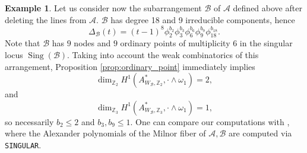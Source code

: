 \documentclass[11pt]{amsart}
\DeclareMathOperator{\Sing}{Sing}
\def\cA{{\mathcal A}}
\def\w{\omega}
\theoremstyle{plain}
\theoremstyle{definition}
\newtheorem{example}[thm]{Example}
\begin{document}
\begin{example}
Let us consider now the subarrangement $\mathcal{B}$ of $\cA$ defined above after deleting the lines from $\cA$. 
 $\mathcal B$ has degree 18 and 9 irreducible components, hence
 $$
 \Delta_{\mathcal{B}}(t) = (t-1)^{8}\phi_2^{b_2}\phi_3^{b_3}\phi_{6}^{b_{6}}\phi_9^{b_9}\phi_{18}^{b_{18}}.
 $$
Note that $\mathcal B$ has $9$ nodes and $9$ ordinary points of multiplicity $6$ in the singular locus $\Sing(\mathcal{B})$. 
Taking into account the weak combinatorics of this arrangement, Proposition \ref{prop:ordinary_point} immediately implies 
$$\dim_{\mathbb{Z}_2} H^1(A^*_{W_{\mathcal{B}},\mathbb{Z}_2},\cdot\wedge\w_1)=2,$$ and
$$\dim_{\mathbb{Z}_3} H^1(A^*_{W_{\mathcal{B}},\mathbb{Z}_3},\cdot\wedge\w_1)=1,$$
so necessarily $b_2 \leq 2$ and $b_3, b_9 \leq 1.$
 One can compare our computations with \cite[Theorem 6.2]{DPS}, where the Alexander polynomials of the Milnor fiber of $\mathcal{A}, \mathcal{B}$ are computed via \verb}SINGULAR}.
\end{example}
\end{document}
